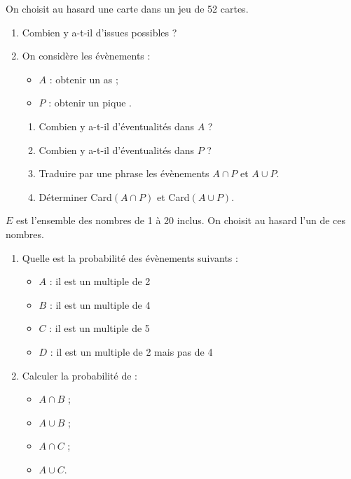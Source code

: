 \begin{exo}
On choisit au hasard une carte dans un jeu de 52 cartes.
\begin{enumerate}
	\item Combien y a-t-il d'issues possibles ?
	\item On consid\`ere les \'ev\`enements :
\begin{itemize}
	\item $A$ : \og obtenir un as \fg ;
	\item $P$ : \og obtenir un pique \fg.
\end{itemize}
\begin{enumerate}
	\item Combien y a-t-il d'\'eventualit\'es dans $A$ ?
	\item Combien y a-t-il d'\'eventualit\'es dans $P$ ?
	\item Traduire par une phrase les \'ev\`enements $A\cap P$ et $A\cup P$.
	\item D\'eterminer Card$(A\cap P)$ et Card$(A\cup P)$.
\end{enumerate}
\end{enumerate}
\end{exo}



\sautpage

\begin{exo}
$E$ est l'ensemble des nombres de 1 \`a 20 inclus. On choisit au hasard l'un de ces nombres.

\begin{enumerate}
	\item Quelle est la probabilit\'e des \'ev\`enements suivants :
\begin{itemize}
	\item $A$ : \og il est un multiple de 2 \fg
	\item $B$ : \og il est un multiple de 4 \fg
	\item $C$ : \og il est un multiple de 5 \fg
	\item $D$ : \og il est un multiple de 2 mais pas de 4 \fg
\end{itemize}
\item Calculer la probabilit\'e de :
\vspace{-1em}\begin{multicols}{4}
\begin{itemize}
	\item $A \cap B$ ;
	\item $A \cup B$ ;
	\item $A \cap C$ ;
	\item $A \cup C$.
\end{itemize}\end{multicols}\vspace{-1em}
\end{enumerate}

\end{exo}

